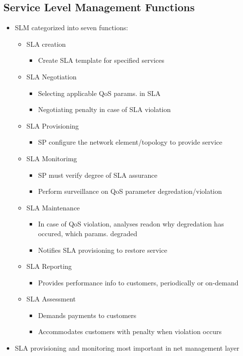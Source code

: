 \subsection{Service Level Management Functions}
\begin{itemize}
	\item SLM categorized into seven functions:
	\begin{itemize}
		\item SLA creation
		\begin{itemize}
			\item Create SLA template for specified services
		\end{itemize}
		\item SLA Negotiation
		\begin{itemize}
			\item Selecting applicable QoS params. in SLA
			\item Negotiating penalty in case of SLA violation
		\end{itemize}
		\item SLA Provisioning
		\begin{itemize}
			\item SP configure the network element/topology to
				provide service
		\end{itemize}
		\item SLA Monitorimg
		\begin{itemize}
			\item SP must verify degree of SLA assurance
			\item Perform surveillance on QoS parameter
				degredation/violation
		\end{itemize}
		\item SLA Maintenance
		\begin{itemize}
			\item  In case of QoS violation, analyses readon why
				degredation has occured, which params. degraded
			\item Notifies SLA provisioning to restore service
		\end{itemize}
		\item SLA Reporting
		\begin{itemize}
			\item Provides performance info to customers,
				periodically or on-demand
		\end{itemize}
		\item SLA Assessment
		\begin{itemize}
			\item Demands payments to customers
			\item Accommodates customers with penalty when violation
				occurs
		\end{itemize}
	\end{itemize}
	\item SLA provisioning and monitoring most important in net management
		layer
\end{itemize}
